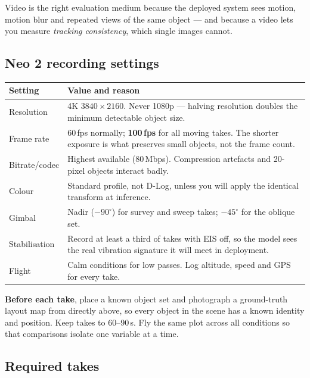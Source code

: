\documentclass[11pt,a4paper]{article}
\begin{document}
Video is the right evaluation medium because the deployed system sees motion,
motion blur and repeated views of the same object --- and because a video lets
you measure \emph{tracking consistency}, which single images cannot.

\subsection*{Neo 2 recording settings}

\begin{center}
\begin{tabular}{lp{9.2cm}}
\toprule
\textbf{Setting} & \textbf{Value and reason} \\
\midrule
Resolution & 4K $3840\times2160$. Never 1080p --- halving resolution doubles
the minimum detectable object size. \\
Frame rate & 60\,fps normally; \textbf{100\,fps} for all moving takes. The
shorter exposure is what preserves small objects, not the frame count. \\
Bitrate/codec & Highest available (80\,Mbps). Compression artefacts and
20-pixel objects interact badly. \\
Colour & Standard profile, not D-Log, unless you will apply the identical
transform at inference. \\
Gimbal & Nadir ($-90^\circ$) for survey and sweep takes; $-45^\circ$ for the
oblique set. \\
Stabilisation & Record at least a third of takes with EIS off, so the model
sees the real vibration signature it will meet in deployment. \\
Flight & Calm conditions for low passes. Log altitude, speed and GPS for
every take. \\
\bottomrule
\end{tabular}
\end{center}

\noindent\textbf{Before each take}, place a known object set and photograph a
ground-truth layout map from directly above, so every object in the scene has a
known identity and position. Keep takes to 60--90\,s. Fly the same plot across
all conditions so that comparisons isolate one variable at a time.

\subsection*{Required takes}
\end{document}
